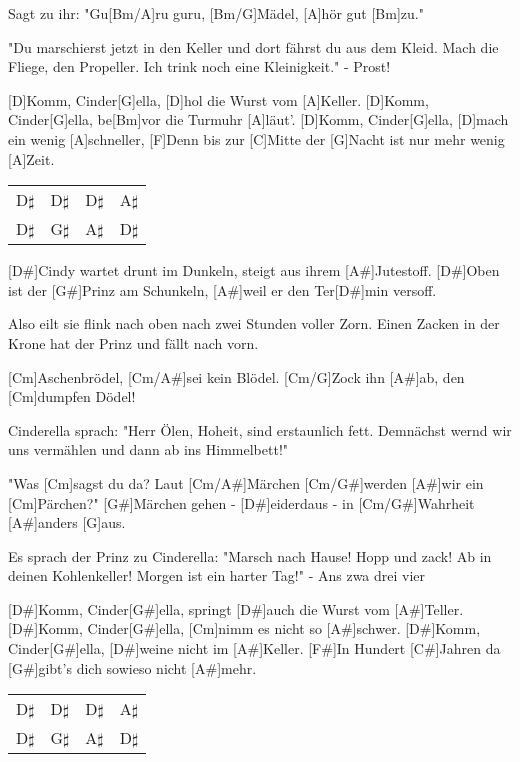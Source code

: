 \begin{spacing}{0.96}
\begin{guitar}
	[Bm]Sagt zu ihr: "Gu[Bm/A]ru guru, [Bm/G]Mädel, [A]hör gut [Bm]zu."
	
	"Du marschierst jetzt in den Keller und dort fährst du aus dem Kleid.
	Mach die Fliege, den Propeller. Ich trink noch eine Kleinigkeit."
	\hfill- Prost!
	\begin{highlightbar}
		[D]Komm, Cinder[G]ella, [D]hol die Wurst vom [A]Keller. 
		[D]Komm, Cinder[G]ella, be[Bm]vor die Turmuhr [A]läut'.
		[D]Komm, Cinder[G]ella, [D]mach ein wenig [A]schneller, 
		[F]Denn bis zur [C]Mitte der [G]Nacht ist nur mehr wenig [A]Zeit.
	\end{highlightbar}
	
	 {\footnotesize\begin{tabular}{l|l|l|l}
			D$\sharp$ & D$\sharp$ & D$\sharp$ & A$\sharp$ \\
			D$\sharp$ & G$\sharp$ & A$\sharp$ & D$\sharp$ 
	\end{tabular}}
	\songsection{Strophe 5}
	[D#]Cindy wartet drunt im Dunkeln, steigt aus ihrem [A#]Jutestoff.
	[D#]Oben ist der [G#]Prinz am Schunkeln, [A#]weil er den Ter[D#]min versoff.
	
	Also eilt sie flink nach oben nach zwei Stunden voller Zorn.
	Einen Zacken in der Krone hat der Prinz und fällt nach vorn.
	
	[Cm]Aschenbrödel, [Cm/A#]sei kein Blödel. [Cm/G]Zock ihn [A#]ab, den [Cm]dumpfen Dödel!
	
	\songsection{Strophe 6}
	Cinderella sprach: "Herr Ölen, Hoheit, sind erstaunlich fett.
	Demnächst wernd wir uns vermählen und dann ab ins Himmelbett!"
	
	"Was [Cm]sagst du da? Laut [Cm/A#]Märchen [Cm/G#]werden [A#]wir ein [Cm]Pärchen?"
	[G#]Märchen gehen - [D#]eiderdaus - in [Cm/G#]Wahrheit [A#]anders [G]aus.
	
	Es sprach der Prinz zu Cinderella: "Marsch nach Hause! Hopp und zack!
	Ab in deinen Kohlenkeller! Morgen ist ein harter Tag!"
	\hfill- Ans zwa drei vier
	\begin{highlightbar}
		\songsection{Refrain}
		[D#]Komm, Cinder[G#]ella, springt [D#]auch die Wurst vom [A#]Teller.
		[D#]Komm, Cinder[G#]ella, [Cm]nimm es nicht so [A#]schwer.
		[D#]Komm, Cinder[G#]ella, [D#]weine nicht im [A#]Keller.
		[F#]In Hundert [C#]Jahren da [G#]gibt's dich sowieso nicht [A#]mehr.
	\end{highlightbar}
	
	 {\footnotesize\begin{tabular}{l|l|l|l}
			D$\sharp$ & D$\sharp$ & D$\sharp$ & A$\sharp$ \\
			D$\sharp$ & G$\sharp$ & A$\sharp$ & D$\sharp$ 
	\end{tabular}}
\end{guitar}
\end{spacing}